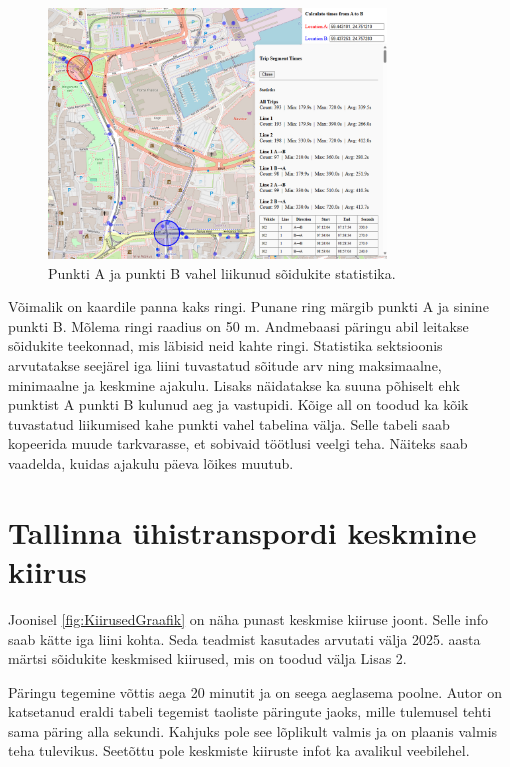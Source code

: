 \begin{figure}[h!]
    \centering
    \includegraphics[width=0.8\textwidth]{figures/Liin1VsLiin2V2.png}
    \caption{Punkti A ja punkti B vahel liikunud sõidukite statistika.}
    \label{fig:Liin1VsLiin2V2}
\end{figure}

Võimalik on kaardile panna kaks ringi. Punane ring märgib punkti A ja sinine punkti B. Mõlema ringi raadius on 50 m. Andmebaasi päringu abil leitakse sõidukite teekonnad, mis läbisid neid kahte ringi. Statistika sektsioonis arvutatakse seejärel iga liini tuvastatud sõitude arv ning maksimaalne, minimaalne ja keskmine ajakulu. Lisaks näidatakse ka suuna põhiselt ehk punktist A punkti B kulunud aeg ja vastupidi. Kõige all on toodud ka kõik tuvastatud liikumised kahe punkti vahel tabelina välja. Selle tabeli saab kopeerida muude tarkvarasse, et sobivaid töötlusi veelgi teha. Näiteks saab vaadelda, kuidas ajakulu päeva lõikes muutub.


\section{Tallinna ühistranspordi keskmine kiirus}

Joonisel \ref{fig:KiirusedGraafik} on näha punast keskmise kiiruse joont. Selle info saab kätte iga liini kohta. Seda teadmist kasutades arvutati välja 2025. aasta märtsi sõidukite keskmised kiirused, mis on toodud välja Lisas 2.

Päringu tegemine võttis aega 20 minutit ja on seega aeglasema poolne. Autor on katsetanud eraldi tabeli tegemist taoliste päringute jaoks, mille tulemusel tehti sama päring alla sekundi. Kahjuks pole see lõplikult valmis ja on plaanis valmis teha tulevikus. Seetõttu pole keskmiste kiiruste infot ka avalikul veebilehel.

